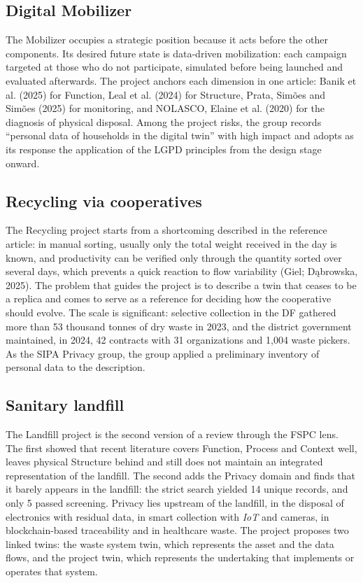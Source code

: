 \documentclass[12pt,a4paper,article,oneside,brazil,english]{abntex2}
\begin{document}
\subsection{Digital Mobilizer}

The Mobilizer occupies a strategic position because it acts before the other components. Its desired future state is data-driven mobilization: each campaign targeted at those who do not participate, simulated before being launched and evaluated afterwards. The project anchors each dimension in one article: Banik et al. (2025) for Function, Leal et al. (2024) for Structure, Prata, Simões and Simões (2025) for monitoring, and NOLASCO, Elaine et al. (2020) for the diagnosis of physical disposal. Among the project risks, the group records ``personal data of households in the digital twin'' with high impact and adopts as its response the application of the LGPD principles from the design stage onward.

\subsection{Recycling via cooperatives}

The Recycling project starts from a shortcoming described in the reference article: in manual sorting, usually only the total weight received in the day is known, and productivity can be verified only through the quantity sorted over several days, which prevents a quick reaction to flow variability (Giel; Dąbrowska, 2025). The problem that guides the project is to describe a twin that ceases to be a replica and comes to serve as a reference for deciding how the cooperative should evolve. The scale is significant: selective collection in the DF gathered more than 53 thousand tonnes of dry waste in 2023, and the district government maintained, in 2024, 42 contracts with 31 organizations and 1,004 waste pickers. As the SIPA Privacy group, the group applied a preliminary inventory of personal data to the description.

\subsection{Sanitary landfill}

The Landfill project is the second version of a review through the FSPC lens. The first showed that recent literature covers Function, Process and Context well, leaves physical Structure behind and still does not maintain an integrated representation of the landfill. The second adds the Privacy domain and finds that it barely appears in the landfill: the strict search yielded 14 unique records, and only 5 passed screening. Privacy lies upstream of the landfill, in the disposal of electronics with residual data, in smart collection with \textit{IoT} and cameras, in blockchain-based traceability and in healthcare waste. The project proposes two linked twins: the waste system twin, which represents the asset and the data flows, and the project twin, which represents the undertaking that implements or operates that system.
\end{document}
